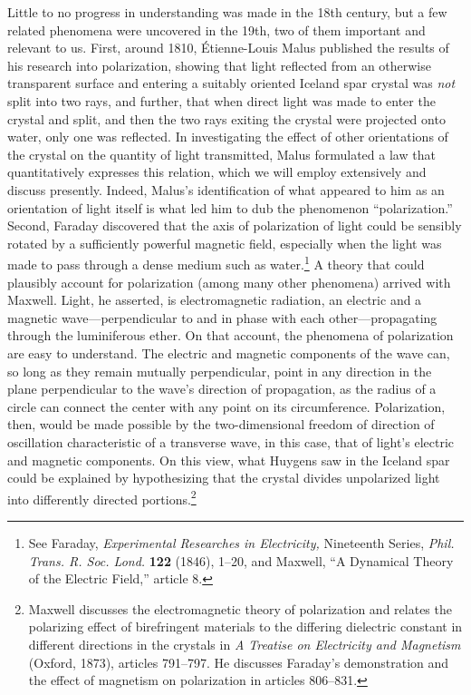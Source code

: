 Little to no progress in understanding was made in the 18th century, but a few related phenomena were uncovered in the 19th, two of them important and relevant to us. First, around 1810, \'Etienne-Louis Malus published the results of his research into polarization, showing that light reflected from an otherwise transparent surface and entering a suitably oriented Iceland spar crystal was \emph{not} split into two rays, and further, that when direct light was made to enter the crystal and split, and then the two rays exiting the crystal were projected onto water, only one was reflected. In investigating the effect of other orientations of the crystal on the quantity of light transmitted, Malus formulated a law that quantitatively expresses this relation, which we will employ extensively and discuss presently. Indeed, Malus's identification of what appeared to him as an orientation of light itself is what led him to dub the phenomenon ``polarization.'' Second, Faraday dis\-co\-ve\-red that the axis of polarization of light could be sensibly rotated by a sufficiently pow\-er\-ful mag\-net\-ic field, especially when the light was made to pass through a dense medium such as water.\footnote{See Faraday, \emph{Experimental Researches in Electricity,} Nineteenth Series, \emph{Phil. Trans. R. Soc. Lond.} \textbf{122} (1846), 1--20, and Maxwell, ``A Dynamical Theory of the Electric Field,'' article 8.} A theory that could plausibly account for polarization (among many other phe\-nom\-e\-na) arrived with Maxwell. Light, he asserted, is electromagnetic radiation, an electric and a magnetic wave---perpendicular to and in phase with each other---propagating through the luminiferous ether. On that account, the phenomena of polarization are easy to understand. The electric and magnetic components of the wave can, so long as they remain mutually perpendicular, point in any direction in the plane perpendicular to the wave’s direction of propagation, as the radius of a circle can connect the center with any point on its circumference. Polarization, then, would be made possible by the two-dimensional freedom of direction of oscillation characteristic of a transverse wave, in this case, that of light's electric and magnetic components. On this view, what Huygens saw in the Iceland spar could be explained by hypothesizing that the crystal divides unpolarized light into differently directed portions.\footnote{Maxwell discusses the electromagnetic theory of polarization and relates the polarizing effect of birefringent materials to the differing dielectric constant in different directions in the crystals in \emph{A Treatise on Electricity and Magnetism} (Oxford, 1873), articles 791--797. He discusses Faraday's demonstration and the effect of magnetism on polarization in articles 806--831.}

